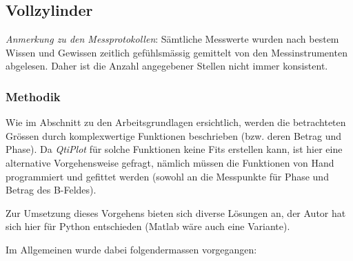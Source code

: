 \subsection{Vollzylinder}
\label{sec:ausw:subsec:hohlz}


\emph{Anmerkung  zu den  Messprotokollen}: S\"amtliche  Messwerte wurden  nach
bestem  Wissen  und  Gewissen  zeitlich gef\"uhlsm\"assig  gemittelt  von  den
Messinstrumenten  abgelesen. Daher ist  die Anzahl  angegebener Stellen  nicht
immer konsistent.


\subsubsection{Methodik}
\label{sec:ausw:subsec:methodik}

Wie im Abschnitt zu den Arbeitsgrundlagen ersichtlich, werden die betrachteten
Gr\"ossen durch  komplexwertige Funktionen beschrieben (bzw.  deren Betrag und
Phase). Da \emph{QtiPlot}  f\"ur solche Funktionen keine  Fits erstellen kann,
ist  hier  eine  alternative  Vorgehensweise gefragt,  n\"amlich  m\"ussen die
Funktionen von Hand programmiert und gefittet werden (sowohl an die Messpunkte
f\"ur Phase und Betrag des B-Feldes).

Zur Umsetzung dieses Vorgehens bieten sich diverse L\"osungen an, der Autor hat
sich hier f\"ur Python entschieden (Matlab w\"are auch eine Variante).

Im Allgemeinen wurde dabei folgendermassen vorgegangen:

